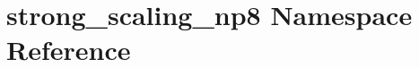 \hypertarget{namespacestrong__scaling__np8}{}\section{strong\+\_\+scaling\+\_\+np8 Namespace Reference}
\label{namespacestrong__scaling__np8}

